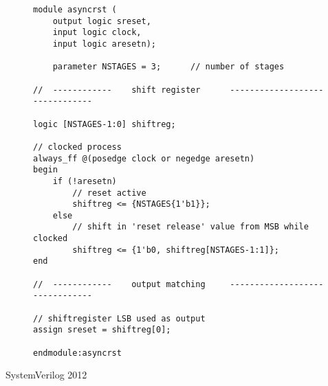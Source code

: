 \begin{center}
    \begin{figure}[h]
        \begin{verbatim}
module asyncrst (
    output logic sreset,
    input logic clock,
    input logic aresetn);

    parameter NSTAGES = 3;      // number of stages

//  ------------    shift register      -------------------------------

logic [NSTAGES-1:0] shiftreg;

// clocked process
always_ff @(posedge clock or negedge aresetn)
begin
    if (!aresetn)
        // reset active
        shiftreg <= {NSTAGES{1'b1}};
    else
        // shift in 'reset release' value from MSB while clocked
        shiftreg <= {1'b0, shiftreg[NSTAGES-1:1]};
end

//  ------------    output matching     -------------------------------

// shiftregister LSB used as output
assign sreset = shiftreg[0];

endmodule:asyncrst
        \end{verbatim}
    \end{figure}
    SystemVerilog 2012
\end{center}
